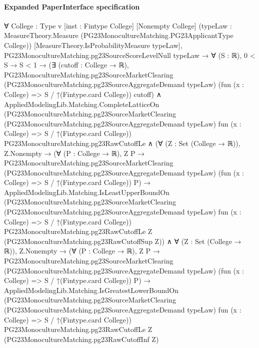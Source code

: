 \documentclass[10pt]{article}
\begin{document}
\paragraph{Expanded PaperInterface specification}
\begin{ReviewVerbatim}
∀ {College : Type v} [inst : Fintype College] [Nonempty College]
  (typeLaw : MeasureTheory.Measure (PG23MonocultureMatching.PG23ApplicantType College))
  [MeasureTheory.IsProbabilityMeasure typeLaw],
  PG23MonocultureMatching.pg23SourceScoreLevelNull typeLaw →
    ∀ (S : ℝ),
      0 < S →
        S < 1 →
          (∃ (cutoff : College → ℝ),
              PG23MonocultureMatching.pg23SourceMarketClearing
                (PG23MonocultureMatching.pg23SourceAggregateDemand typeLaw)
                (fun (x : College) => S / ↑(Fintype.card College)) cutoff) ∧
            AppliedModelingLib.Matching.CompleteLatticeOn
                (PG23MonocultureMatching.pg23SourceMarketClearing
                  (PG23MonocultureMatching.pg23SourceAggregateDemand typeLaw) fun (x : College) =>
                  S / ↑(Fintype.card College))
                PG23MonocultureMatching.pg23RawCutoffLe ∧
              (∀ (Z : Set (College → ℝ)),
                  Z.Nonempty →
                    (∀ (P : College → ℝ),
                        Z P →
                          PG23MonocultureMatching.pg23SourceMarketClearing
                            (PG23MonocultureMatching.pg23SourceAggregateDemand typeLaw)
                            (fun (x : College) => S / ↑(Fintype.card College)) P) →
                      AppliedModelingLib.Matching.IsLeastUpperBoundOn
                        (PG23MonocultureMatching.pg23SourceMarketClearing
                          (PG23MonocultureMatching.pg23SourceAggregateDemand typeLaw) fun (x : College) =>
                          S / ↑(Fintype.card College))
                        PG23MonocultureMatching.pg23RawCutoffLe Z (PG23MonocultureMatching.pg23RawCutoffSup Z)) ∧
                ∀ (Z : Set (College → ℝ)),
                  Z.Nonempty →
                    (∀ (P : College → ℝ),
                        Z P →
                          PG23MonocultureMatching.pg23SourceMarketClearing
                            (PG23MonocultureMatching.pg23SourceAggregateDemand typeLaw)
                            (fun (x : College) => S / ↑(Fintype.card College)) P) →
                      AppliedModelingLib.Matching.IsGreatestLowerBoundOn
                        (PG23MonocultureMatching.pg23SourceMarketClearing
                          (PG23MonocultureMatching.pg23SourceAggregateDemand typeLaw) fun (x : College) =>
                          S / ↑(Fintype.card College))
                        PG23MonocultureMatching.pg23RawCutoffLe Z (PG23MonocultureMatching.pg23RawCutoffInf Z)
\end{ReviewVerbatim}
\end{document}
